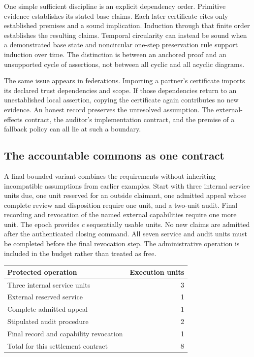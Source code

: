 One simple sufficient discipline is an explicit dependency order. Primitive evidence establishes its stated base claims. Each later certificate cites only established premises and a sound implication. Induction through that finite order establishes the resulting claims. Temporal circularity can instead be sound when a demonstrated base state and noncircular one-step preservation rule support induction over time. The distinction is between an anchored proof and an unsupported cycle of assertions, not between all cyclic and all acyclic diagrams.

The same issue appears in federations. Importing a partner's certificate imports its declared trust dependencies and scope. If those dependencies return to an unestablished local assertion, copying the certificate again contributes no new evidence. An honest record preserves the unresolved assumption. The external-effects contract, the auditor's implementation contract, and the premise of a fallback policy can all lie at such a boundary.

\subsection{The accountable commons as one contract}\label{MS:sec:accountable-commons}

A final bounded variant combines the requirements without inheriting incompatible assumptions from earlier examples. Start with three internal service units due, one unit reserved for an outside claimant, one admitted appeal whose complete review and disposition require one unit, and a two-unit audit. Final recording and revocation of the named external capabilities require one more unit. The epoch provides $c$ sequentially usable units. No new claims are admitted after the authenticated closing command. All seven service and audit units must be completed before the final revocation step. The administrative operation is included in the budget rather than treated as free.

\begin{center}
\begin{tabular}{@{}lr@{}}
\toprule
Protected operation & Execution units\\
\midrule
Three internal service units & 3\\
External reserved service & 1\\
Complete admitted appeal & 1\\
Stipulated audit procedure & 2\\
Final record and capability revocation & 1\\
\midrule
Total for this settlement contract & 8\\
\bottomrule
\end{tabular}
\end{center}

